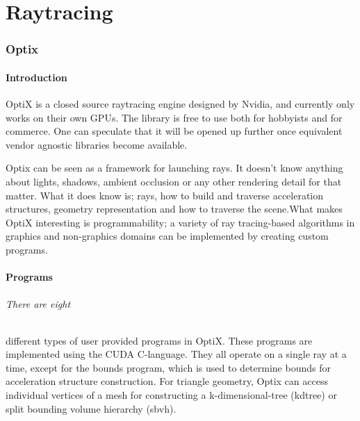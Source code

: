 \part{Raytracing}
\section{Optix}

\subsection{Introduction}
OptiX is a closed source raytracing engine designed by Nvidia, and currently only works on their own GPUs. The library is free to use both for hobbyists and for commerce. One can speculate that it will be opened up further once equivalent vendor agnostic libraries become available.

Optix can be seen as a framework for launching rays. It doesn't know anything about lights, shadows, ambient occlusion or any other rendering detail for that matter. What it does know is; rays, how to build and traverse acceleration structures, geometry representation and how to traverse the scene.What makes OptiX interesting is programmability; a variety of ray tracing-based algorithms in graphics and non-graphics domains can be implemented \cite{Parker10OptiX} by creating custom programs.

\subsection{Programs}
\paragraph{There are eight} different types of user provided programs in OptiX. These programs are implemented using the CUDA C-language. They all operate on a single ray at a time, except for the bounds program, which is used to determine bounds for acceleration structure construction. For triangle geometry, Optix can access individual vertices of a mesh for constructing a k-dimensional-tree (kdtree) or split bounding volume hierarchy  (sbvh).

